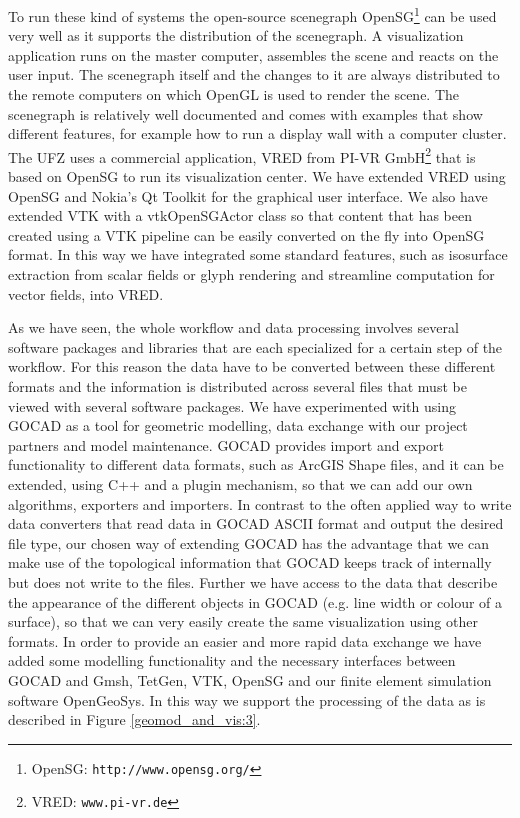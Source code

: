 To run these kind of systems the open-source scenegraph OpenSG\footnote{OpenSG: \texttt{http://www.opensg.org/}} \cite{Reiners2002} can be used very well as it supports the distribution of the scenegraph. A visualization application runs on the master computer, assembles the scene and reacts on the user input. The scenegraph itself and the changes to it are always distributed to the remote computers on which OpenGL is used to render the scene. The scenegraph is relatively well documented and comes with examples that show different features, for example how to run a display wall with a computer cluster. The UFZ uses a commercial application, VRED from PI-VR GmbH\footnote{VRED: \texttt{www.pi-vr.de}} that is based on OpenSG to run its visualization center. We have extended VRED using OpenSG and Nokia's Qt Toolkit for the graphical user interface. We also have extended VTK with a vtkOpenSGActor class so that content that has been created using a VTK pipeline can be easily converted on the fly into OpenSG format. In this way we have integrated some standard features, such as isosurface extraction from scalar fields or glyph rendering and streamline computation for vector fields, into VRED.

As we have seen, the whole workflow and data processing involves several software packages and libraries that are each specialized for a certain step of the workflow. For this reason the data have to be converted between these different formats and the information is distributed across several files that must be viewed with several software packages. We have experimented with using GOCAD as a tool for geometric modelling, data exchange with our project partners and model maintenance. GOCAD provides import and export functionality to different data formats, such as ArcGIS Shape files, and it can be extended, using C++ and a plugin mechanism, so that we can add our own algorithms, exporters and importers. In contrast to the often applied way to write data converters that read data in GOCAD ASCII format and output the desired file type, our chosen way of extending GOCAD has the advantage that we can make use of the topological information that GOCAD keeps track of internally but does not write to the files. Further we have access to the data that describe the appearance of the different objects in GOCAD (e.g. line width or colour of a surface), so that we can very easily create the same visualization using other formats. In order to provide an easier and more rapid data exchange we have added some modelling functionality and the necessary interfaces between GOCAD and Gmsh, TetGen, VTK, OpenSG and our finite element simulation software OpenGeoSys. In this way we support the processing of the data as is described in Figure \ref{geomod_and_vis:3}. 

